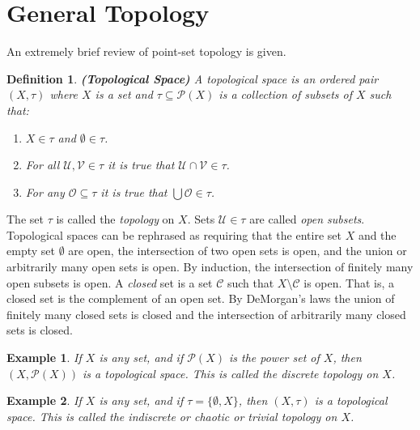 \documentclass{article}
\theoremstyle{plain}
\theoremstyle{normal}
\newtheorem{definition}{Definition}[section]
\newtheorem{example}{Example}[section]
\begin{document}
    \section{General Topology}
        An extremely brief review of point-set topology is given.
        \begin{definition}{\textbf{(Topological Space)}}
            A topological space is an ordered pair $(X,\tau)$ where $X$ is a
            set and $\tau\subseteq\mathcal{P}(X)$ is a collection of subsets of
            $X$ such that:
            \begin{enumerate}
                \item $X\in\tau$ and $\emptyset\in\tau$.
                \item For all $\mathcal{U},\mathcal{V}\in\tau$ it is true that
                    $\mathcal{U}\cap\mathcal{V}\in\tau$.
                \item For any $\mathcal{O}\subseteq\tau$ it is true that
                    $\bigcup\mathcal{O}\in\tau$.
            \end{enumerate}
        \end{definition}
        The set $\tau$ is called the \textit{topology} on $X$. Sets
        $\mathcal{U}\in\tau$ are called \textit{open subsets}. Topological
        spaces can be rephrased as requiring that the entire set $X$ and the
        empty set $\emptyset$ are open, the intersection of two open sets is
        open, and the union or arbitrarily many open sets is open. By induction,
        the intersection of finitely many open subsets is open. A
        \textit{closed} set is a set $\mathcal{C}$ such that
        $X\setminus\mathcal{C}$ is open. That is, a closed set is the complement
        of an open set. By DeMorgan's laws the union of finitely many closed
        sets is closed and the intersection of arbitrarily many closed sets is
        closed.
        \begin{example}
            If $X$ is any set, and if $\mathcal{P}(X)$ is the power set of $X$,
            then $(X,\mathcal{P}(X))$ is a topological space. This is called the
            \textit{discrete} topology on $X$.
        \end{example}
        \begin{example}
            If $X$ is any set, and if $\tau=\{\emptyset,X\}$, then
            $(X,\tau)$ is a topological space. This is called the
            \textit{indiscrete} or \textit{chaotic} or \textit{trivial} topology
            on $X$.
        \end{example}
\end{document}
